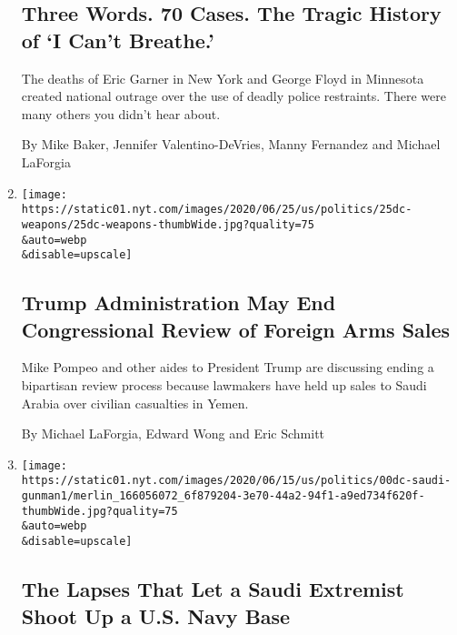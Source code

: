 \begin{enumerate}
  \hypertarget{three-words-70-cases-the-tragic-history-of-i-cant-breathe}{%
  \subsection{Three Words. 70 Cases. The Tragic History of `I Can't
  Breathe.'}\label{three-words-70-cases-the-tragic-history-of-i-cant-breathe}}

  The deaths of Eric Garner in New York and George Floyd in Minnesota
  created national outrage over the use of deadly police restraints.
  There were many others you didn't hear about.

  By Mike Baker, Jennifer Valentino-DeVries, Manny Fernandez and Michael
  LaForgia
\item
  \href{/2020/06/25/us/politics/trump-congress-arms-sales.html}{}

  \texttt{[image: https://static01.nyt.com/images/2020/06/25/us/politics/25dc-weapons/25dc-weapons-thumbWide.jpg?quality=75\\\&auto=webp\\\&disable=upscale]}

  \hypertarget{trump-administration-may-end-congressional-review-of-foreign-arms-sales}{%
  \subsection{Trump Administration May End Congressional Review of
  Foreign Arms
  Sales}\label{trump-administration-may-end-congressional-review-of-foreign-arms-sales}}

  Mike Pompeo and other aides to President Trump are discussing ending a
  bipartisan review process because lawmakers have held up sales to
  Saudi Arabia over civilian casualties in Yemen.

  By Michael LaForgia, Edward Wong and Eric Schmitt
\item
  \href{/2020/06/21/us/politics/saudi-gunman-vetting.html}{}

  \texttt{[image: https://static01.nyt.com/images/2020/06/15/us/politics/00dc-saudi-gunman1/merlin\_166056072\_6f879204-3e70-44a2-94f1-a9ed734f620f-thumbWide.jpg?quality=75\\\&auto=webp\\\&disable=upscale]}

  \hypertarget{the-lapses-that-let-a-saudi-extremist-shoot-up-a-us-navy-base}{%
  \subsection{The Lapses That Let a Saudi Extremist Shoot Up a U.S. Navy
  Base}\label{the-lapses-that-let-a-saudi-extremist-shoot-up-a-us-navy-base}}


\end{enumerate}
